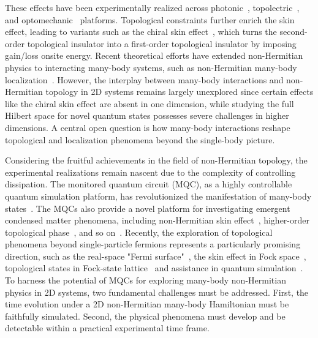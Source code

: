 \documentclass[longbibliography, aps, prx, amsmath, amssymb, amsfonts, twocolumn,superscriptaddress, footinbib]{revtex4-1}
\begin{document}
	These effects have been experimentally realized across photonic~\cite{RN1165,RN1167,RN1227,nie2023non}, topolectric~\cite{zou2021observation,RN2,RN1225}, and optomechanic~\cite{RN632,RN1226} platforms. Topological constraints further enrich the skin effect, leading to variants such as the chiral skin effect~\cite{nakamura2023universal,ma2024non,schindler2023hermitian,lee2019hybrid,RN1221}, which turns the second-order topological insulator into a first-order topological insulator by imposing gain/loss onsite energy. 
	Recent theoretical efforts have extended non-Hermitian physics to interacting many-body systems, such as non-Hermitian many-body localization~\cite{mak2024statics,hamazaki2019non}. However, the interplay between many-body interactions and non-Hermitian topology in 2D systems remains largely unexplored since certain effects like the chiral skin effect are absent in one dimension, while studying the full Hilbert space for novel quantum states possesses severe challenges in higher dimensions. A central open question is how many-body interactions reshape topological and localization phenomena beyond the single-body picture.

	Considering the fruitful achievements in the field of non-Hermitian topology, the experimental realizations remain nascent due to the complexity of controlling dissipation.
    The monitored quantum circuit (MQC), as a highly controllable quantum simulation platform, has revolutionized the manifestation of many-body states~\cite{skinner2019measurement,nahum2017quantum,gullans2020dynamical,koh2023measurement,li2023cross,choi2020quantum,minato2022fate,yang2025bridging,potter2022entanglement,iqbal2024non,zhang2025physics}. 
	The MQCs also provide a novel platform for investigating emergent condensed matter phenomena, including non-Hermitian skin effect~\cite{fleckenstein2022non}, higher-order topological phase~\cite{koh2024realization}, and so on~\cite{iqbal2024non}. Recently, the exploration of topological phenomena beyond single-particle fermions represents a particularly promising direction, such as the real-space "Fermi surface"~\cite{shen2025observation}, the skin effect in Fock space~\cite{shen2024enhanced,shimomura2024general}, topological states in Fock-state lattice~\cite{deng2022observing} and assistance in quantum simulation~\cite{zhao2025}. 
	To harness the potential of MQCs for exploring many-body non-Hermitian physics in 2D systems, two fundamental challenges must be addressed. First, the time evolution under a 2D non-Hermitian many-body Hamiltonian must be faithfully simulated. Second, the physical phenomena must develop and be detectable within a practical experimental time frame.
\end{document}
